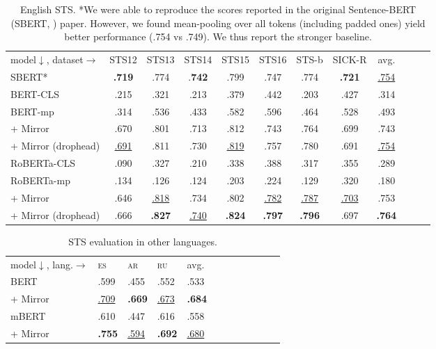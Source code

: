 \documentclass[11pt]{article}
\newcommand{\es}{{\textsc{es}}\xspace}
\newcommand{\ru}{{\textsc{ru}}\xspace}
\newcommand{\ar}{{\textsc{ar}}\xspace}
\begin{document}
\begin{table*}[!t] \centering
\small
\begin{tabular}{l ccccccccccc}
\cmidrule[1.0pt]{1-10}
model$\downarrow$, dataset$\rightarrow$  & STS12 & STS13 & STS14 & STS15 & STS16 & STS-b & SICK-R & avg.\\
\cmidrule[1.0pt]{1-10}
SBERT* & \textbf{.719} & .774 &.\textbf{742} & .799 & .747 & .774 & \textbf{.721} & \underline{.754} \\
\cmidrule[1.0pt]{1-10}
BERT-CLS & .215 & .321 & .213 & .379 & .442 & .203 & .427 & .314 \\
BERT-mp & .314 & .536 & .433 & .582 & .596 & .464 & .528 & .493 \\
\rowcolor{blue!10}
+ Mirror & .670	& .801 & .713 & .812 & .743	& .764	& .699	& .743 \\
\rowcolor{blue!10}
+ Mirror (drophead) & \underline{.691}	& .811	& .730	& \underline{.819}	& .757	& .780	& .691 & \underline{.754} \\
\cmidrule[1.0pt]{1-10}
RoBERTa-CLS & .090 & .327 & .210 &.338 & .388 & .317 & .355 & .289 \\
RoBERTa-mp & .134 & .126 & .124 & .203 & .224 & .129 & .320 & .180 \\
\rowcolor{blue!10}
+ Mirror & .646	& \underline{.818}	& .734	& .802	& \underline{.782}	& \underline{.787} & \underline{.703} & .753 \\
\rowcolor{blue!10}
+ Mirror (drophead) & .666	& \textbf{.827}	& \underline{.740} & \textbf{.824}	& \textbf{.797}	& \textbf{.796}	& .697	& \textbf{.764} \\
\bottomrule
\end{tabular}
\caption{English STS. *We were able to reproduce the scores reported in the original Sentence-BERT (SBERT, \citealt{reimers2019sentence}) paper. However, we found mean-pooling over all tokens (including padded ones) yield better performance (.754 vs .749). We thus report the stronger baseline.}
\label{tab:sts_sota_full}
\end{table*}


\begin{table}[!t]
\centering
\scriptsize
\def\arraystretch{0.8}
\begin{tabularx}{\linewidth}{lXXXXXXXXXXX}
\cmidrule[1.0pt]{1-10}
model$\downarrow$, lang.$\rightarrow$  & \es & \ar & \ru & avg. \\
\cmidrule[1.0pt]{1-10}
BERT & .599 & .455 & .552 & .533 \\
\rowcolor{blue!10}
+ Mirror & \underline{.709} & \textbf{.669} & \underline{.673} & \textbf{.684} \\
\cmidrule[1.0pt]{1-10}
mBERT & .610 & .447 & .616 & .558 \\
\rowcolor{blue!10}
 + Mirror & \textbf{.755} & \underline{.594} & \textbf{.692}  & \underline{.680} \\
\cmidrule[1.0pt]{1-10}
\end{tabularx}
\caption{STS evaluation in other languages.}
\label{tab:sts_multillingual}
\end{table}
\end{document}
